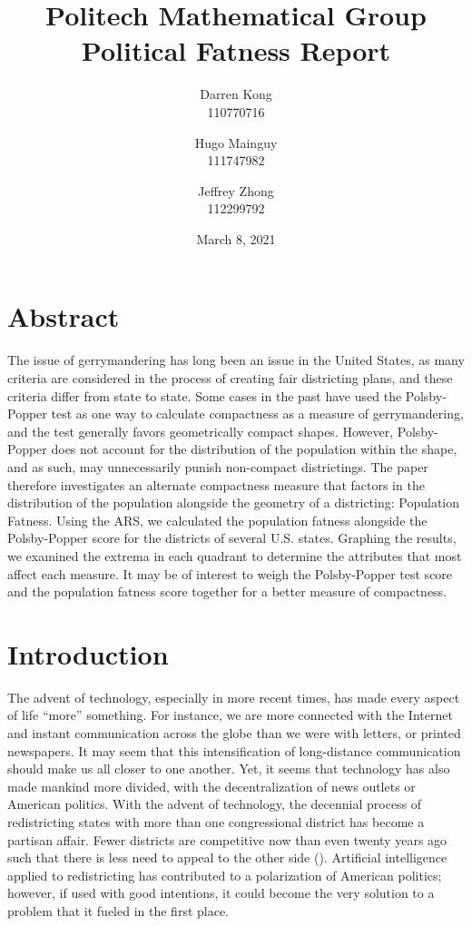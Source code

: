 \documentclass[letterpaper]{article}
\title{
	\textbf{Politech Mathematical Group} \\ 
	\vspace{2ex} 
	Political Fatness Report
	\vspace{2ex}
}
\author{
	Darren Kong \\ 110770716
	\and 
	Hugo Mainguy \\ 111747982
	\and 
	Jeffrey Zhong \\ 112299792
	\vspace{3ex}
}
\date{March 8, 2021}
\begin{document}
\begin{titlepage}
\maketitle
\thispagestyle{empty}
\end{titlepage}

\section{Abstract}
The issue of gerrymandering has long been an issue in the United States, as many criteria are considered in the process of creating fair districting plans, and these criteria differ from state to state. Some cases in the past have used the Polsby-Popper test as one way to calculate compactness as a measure of gerrymandering, and the test generally favors geometrically compact shapes. However, Polsby-Popper does not account for the distribution of the population within the shape, and as such, may unnecessarily punish non-compact districtings. The paper therefore investigates an alternate compactness measure that factors in the distribution of the population alongside the geometry of a districting: Population Fatness. Using the ARS, we calculated the population fatness alongside the Polsby-Popper score for the districts of several U.S. states. Graphing the results, we examined the extrema in each quadrant to determine the attributes that most affect each measure. It may be of interest to weigh the Polsby-Popper test score and the population fatness score together for a better measure of compactness. 


\section{Introduction}

The advent of technology, especially in more recent times, has made every aspect of life “more” something. For instance, we are more connected with the Internet and instant communication across the globe than we were with letters, or printed newspapers. It may seem that this intensification of long-distance communication should make us all closer to one another. Yet, it seems that technology has also made mankind more divided, with the decentralization of news outlets or American politics. With the advent of technology, the decennial process of redistricting states with more than one congressional district has become a partisan affair. Fewer districts are competitive now than even twenty years ago such that there is less need to appeal to the other side (\cite{cook}). Artificial intelligence applied to redistricting has contributed to a polarization of American politics; however, if used with good intentions, it could become the very solution to a problem that it fueled in the first place.
\end{document}
